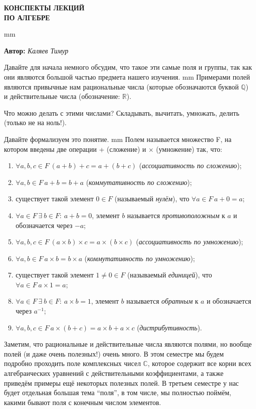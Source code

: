 \documentclass[12pt,english,russian]{article}
\begin{document}
		\begin{center}
			{\Huge {\bf КОНСПЕКТЫ ЛЕКЦИЙ\\ ПО АЛГЕБРЕ}  }
		\end{center}
	 mm
		\begin{center}
			{\large {\bf Автор:} \textit{Каляев Тимур}}
		\end{center}

	Давайте для начала немного обсудим, что такое эти самые поля и группы, так как они являются большой частью предмета нашего
	изучения.
	 mm
	Примерами полей являются привычные нам рациональные числа (которые обозначаются буквой $\mathbb{Q}$) и 
	действительные числа (обозначение: $\mathbb{R}$).

	Что можно делать с этими числами? Складывать, вычитать,
	умножать, делить (только не на ноль!).

	Давайте формализуем это понятие.
	 mm
	Полем называется множество F, на котором введены две операции + (сложение) и $\times$ (умножение) так, что:
	\begin{enumerate}
		\item $\forall a,b,c \in F \ (a+b)+c = a+(b+c)$ (\textit{ассоциативность по сложению});
		\item $\forall a,b \in F \ a+b = b+a$ (\textit{коммутативность по сложению});
		\item существует такой элемент $0 \in F$ (называемый \textit{нулём}), что $\forall a \in F \ a+0 = a$;
		\item $\forall a \in F \ \exists \ b \in F: \ a+b = 0$, элемент $b$  называется \textit{противоположным} к $a$ и обозначается через $-a$;
		\item  $\forall a,b,c \in F \ (a\times b)\times c = a\times(b\times c)$ (\textit{ассоциативность по умножению});
		\item $\forall a,b \in F \ a\times b = b\times a$ (\textit{коммутативность по умножению});
		\item существует такой элемент $1 \ne 0 \in F$ (называемый \textit{единицей}), что $\forall a \in F \ a \times 1 = a$;
		\item $\forall a \in F \ \exists \ b \in F: \ a \times b = 1$, элемент $b$  называется \textit{обратным} к $a$ и обозначается через $a^{-1}$;
		\item $\forall a,b,c \in F \ a \times (b+c) = a \times b + a \times c$ (\textit{дистрибутивность}).
	\end{enumerate}

	Заметим, что рациональные и действительные числа являются
	полями, но вообще полей (и даже очень полезных!) очень много.
	В этом семестре мы будем подробно проходить поле комплексных чисел $\mathbb C$, которое содержит все корни всех алгебраических
	уравнений с действительными коэффициентами, а также приведём 
	примеры ещё некоторых полезных полей. В третьем семестре 
	у нас будет отдельная большая тема “поля”, в том числе, мы
	полностью поймём, какими бывают поля с конечным числом элементов.
\end{document}
